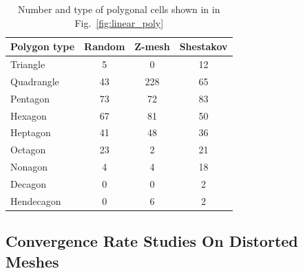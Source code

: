 \documentclass[preprint,10pt]{elsarticle}
\newcommand{\fig}[1]{Fig.~\ref{#1}}                      %
\begin{document}
\begin{table}[htbp]
	\centering
		\begin{tabular}{|l||c|c|c|}
		\hline
		Polygon type       &Random              & Z-mesh & Shestakov  \\ \hline\hline
Triangle  &   5 &  0 & 12 \\ \hline
Quadrangle&  43 & 228& 65 \\ \hline
Pentagon  &  73 & 72 & 83 \\ \hline
Hexagon   &  67 & 81 & 50 \\ \hline
Heptagon  &  41 & 48 & 36 \\ \hline
Octagon   &  23 & 2  & 21 \\ \hline
Nonagon   &   4 & 4  & 18 \\ \hline
Decagon   &   0 & 0  &  2 \\ \hline
Hendecagon&   0 & 6  &  2 \\ \hline		
		\end{tabular}
	\caption{Number and type of polygonal cells shown in in \fig{fig:linear_poly}}
	\label{tab:poly_cell_types_linear_poly}
\end{table}


\subsection{Convergence Rate Studies On Distorted Meshes}
\end{document}

